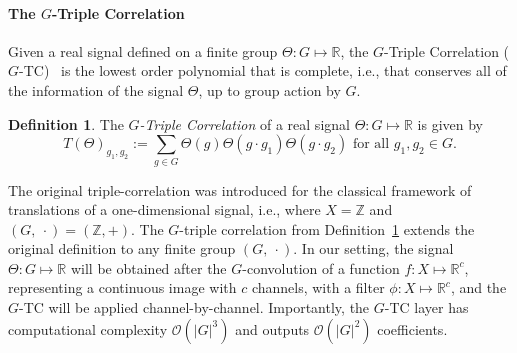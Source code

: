 \documentclass{article}
\theoremstyle{plain}
\theoremstyle{definition}
\newtheorem{definition}[theorem]{Definition}
\theoremstyle{remark}
\begin{document}

\paragraph{The $G$-Triple Correlation}
Given a real signal defined on a finite group $\Theta:G\mapsto\mathbb{R}$, the $G$-Triple Correlation ($G$-TC)~\citep{kakarala_thesis}  is the lowest order polynomial that is complete, i.e., that conserves all of the information of the signal $\Theta$, up to group action by $G$.
\begin{definition}\label{def:gtc}
    The \emph{$G$-Triple Correlation} of a real signal $\Theta:G\mapsto\mathbb{R}$ is given by
    \begin{equation}
        T(\Theta)_{g_1,g_2}:=\sum_{g\in G} \Theta(g)\Theta(g\cdot g_1)\Theta(g\cdot g_2) \text{ for all } g_1, g_2\in G.
    \end{equation}
\end{definition}

The original triple-correlation was introduced for the classical framework of translations of a one-dimensional signal, i.e., where $X =\mathbb{Z}$ and $(G,\ \cdot) = (\mathbb{Z},+)$. The $G$-triple correlation from Definition~\ref{def:gtc} extends the original definition to any finite group $(G,\ \cdot)$. In our setting, the signal $\Theta:G\mapsto\mathbb{R}$ will be obtained after the $G$-convolution of a function $f:X\mapsto\mathbb{R}^c$,
representing a continuous image with $c$ channels, with a filter $\phi:X\mapsto\mathbb{R}^c$, and the $G$-TC will be applied channel-by-channel. Importantly, the $G$-TC layer has computational complexity $\mathcal{O}(|G|^3)$ and outputs $\mathcal{O}(|G|^2)$ coefficients.

\end{document}
